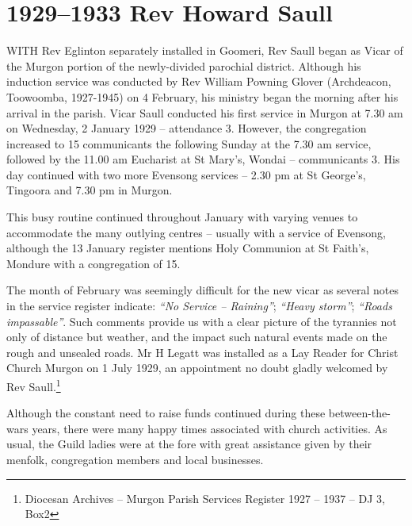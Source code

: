 \printendnotes[custom]
\setcounter{endnote}{0}




\chapter{1929--1933 Rev Howard Saull}
\nobalance


\lettrine[lines=3]{W}{ITH}
 Rev Eglinton separately installed in Goomeri, Rev Saull began as Vicar of the Murgon portion of the newly-divided parochial district. Although his induction service was conducted by Rev William Powning Glover (Archdeacon, Toowoomba, 1927-1945) on 4 February, his ministry began the morning after his arrival in the parish. Vicar Saull conducted his first service in Murgon at 7.30 am on Wednesday, 2 January 1929 -- attendance 3. However, the congregation increased to 15 communicants the following Sunday at the 7.30 am service, followed by the 11.00 am Eucharist at St Mary's, Wondai -- communicants 3. His day continued with two more Evensong services -- 2.30 pm at St George's, Tingoora and 7.30 pm in Murgon.

This busy routine continued throughout January with varying venues to accommodate the many outlying centres -- usually with a service of Evensong, although the 13 January register mentions Holy Communion at St Faith's, Mondure with a congregation of 15.



The month of February was seemingly difficult for the new vicar as several notes in the service register indicate: \emph{``No Service -- Raining''}; \emph{``Heavy storm''}; \emph{``Roads impassable''}. Such comments provide us with a clear picture of the tyrannies not only of distance but weather, and the impact such natural events made on the rough and unsealed roads. Mr H Legatt was installed as a Lay Reader for Christ Church Murgon on 1 July 1929, an appointment no doubt gladly welcomed by Rev Saull.\footnote{Diocesan Archives -- Murgon Parish Services Register 1927 -- 1937 -- DJ 3, Box2}


Although the constant need to raise funds continued during these between-the-wars years, there were many happy times associated with church activities. As usual, the Guild ladies were at the fore with great assistance given by their menfolk, congregation members and local businesses.



